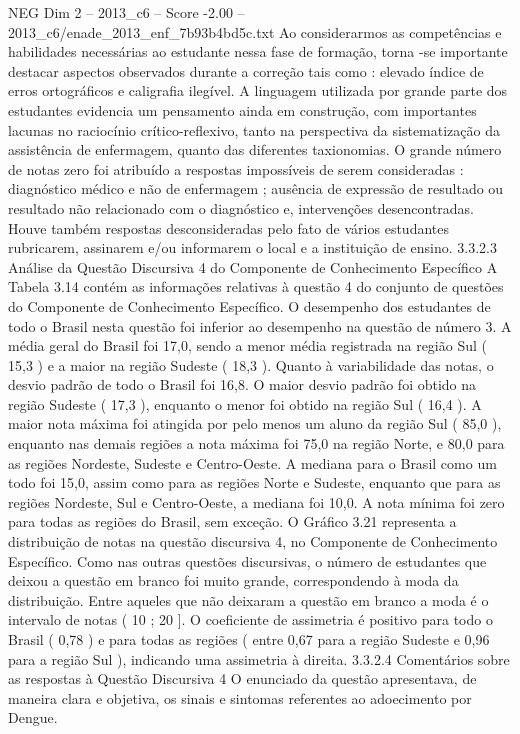 \begin{textsample}{NEG Dim 2 – 2013\_c6 – Score -2.00 – 2013\_c6/enade\_2013\_enf\_7b93b4bd5c.txt}
Ao considerarmos as competências e habilidades necessárias ao estudante nessa fase de formação, torna -se importante destacar aspectos observados durante a correção tais como : elevado índice de erros ortográficos e caligrafia ilegível.
A linguagem utilizada por grande parte dos estudantes evidencia um pensamento ainda em construção, com importantes lacunas no raciocínio crítico-reflexivo, tanto na perspectiva da sistematização da assistência de enfermagem, quanto das diferentes taxionomias.
O grande número de notas zero foi atribuído a respostas impossíveis de serem consideradas : diagnóstico médico e não de enfermagem ; ausência de expressão de resultado ou resultado não relacionado com o diagnóstico e, intervenções desencontradas.
Houve também respostas desconsideradas pelo fato de vários estudantes rubricarem, assinarem e/ou informarem o local e a instituição de ensino. 3.3.2.3 Análise da Questão Discursiva 4 do Componente de Conhecimento Específico A Tabela 3.14 contém as informações relativas à questão 4 do conjunto de questões do Componente de Conhecimento Específico.
O desempenho dos estudantes de todo o Brasil nesta questão foi inferior ao desempenho na questão de número 3.
A média geral do Brasil foi 17,0, sendo a menor média registrada na região Sul ( 15,3 ) e a maior na região Sudeste ( 18,3 ).
Quanto à variabilidade das notas, o desvio padrão de todo o Brasil foi 16,8.
O maior desvio padrão foi obtido na região Sudeste ( 17,3 ), enquanto o menor foi obtido na região Sul ( 16,4 ).
A maior nota máxima foi atingida por pelo menos um aluno da região Sul ( 85,0 ), enquanto nas demais regiões a nota máxima foi 75,0 na região Norte, e 80,0 para as regiões Nordeste, Sudeste e Centro-Oeste.
A mediana para o Brasil como um todo foi 15,0, assim como para as regiões Norte e Sudeste, enquanto que para as regiões Nordeste, Sul e Centro-Oeste, a mediana foi 10,0.
A nota mínima foi zero para todas as regiões do Brasil, sem exceção.
O Gráfico 3.21 representa a distribuição de notas na questão discursiva 4, no Componente de Conhecimento Específico.
Como nas outras questões discursivas, o número de estudantes que deixou a questão em branco foi muito grande, correspondendo à moda da distribuição.
Entre aqueles que não deixaram a questão em branco a moda é o intervalo de notas ( 10 ; 20 ].
O coeficiente de assimetria é positivo para todo o Brasil ( 0,78 ) e para todas as regiões ( entre 0,67 para a região Sudeste e 0,96 para a região Sul ), indicando uma assimetria à direita. 3.3.2.4 Comentários sobre as respostas à Questão Discursiva 4 O enunciado da questão apresentava, de maneira clara e objetiva, os sinais e sintomas referentes ao adoecimento por Dengue.

\end{textsample}
